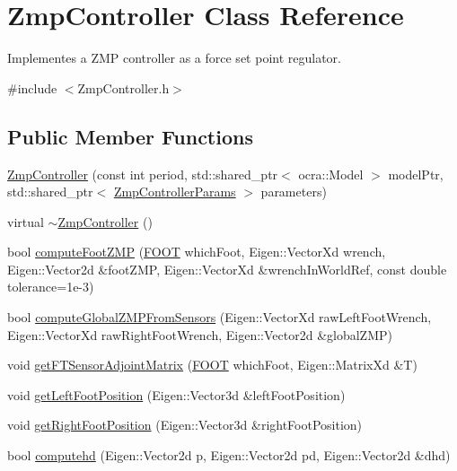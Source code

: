 \hypertarget{classZmpController}{}\section{Zmp\+Controller Class Reference}
\label{classZmpController}


Implementes a Z\+MP controller as a force set point regulator.  




{\ttfamily \#include $<$Zmp\+Controller.\+h$>$}

\subsection*{Public Member Functions}
\begin{DoxyCompactItemize}
\item 
\hyperlink{classZmpController_a4c47608f6d62b6b490808816879c01b7}{Zmp\+Controller} (const int period, std\+::shared\+\_\+ptr$<$ ocra\+::\+Model $>$ model\+Ptr, std\+::shared\+\_\+ptr$<$ \hyperlink{structZmpControllerParams}{Zmp\+Controller\+Params} $>$ parameters)
\item 
virtual \hyperlink{classZmpController_af308a70e70cfe9a1e9569606da8b1739}{$\sim$\+Zmp\+Controller} ()
\item 
bool \hyperlink{classZmpController_a6fd41771d83a31bd190f4031f82649e0}{compute\+Foot\+Z\+MP} (\hyperlink{ZmpController_8h_a4b6a8e135f90bd56e5a57a60efb42529}{F\+O\+OT} which\+Foot, Eigen\+::\+Vector\+Xd wrench, Eigen\+::\+Vector2d \&foot\+Z\+MP, Eigen\+::\+Vector\+Xd \&wrench\+In\+World\+Ref, const double tolerance=1e-\/3)
\item 
bool \hyperlink{classZmpController_aae5cc381a922206dad10ba2d425992ce}{compute\+Global\+Z\+M\+P\+From\+Sensors} (Eigen\+::\+Vector\+Xd raw\+Left\+Foot\+Wrench, Eigen\+::\+Vector\+Xd raw\+Right\+Foot\+Wrench, Eigen\+::\+Vector2d \&global\+Z\+MP)
\item 
void \hyperlink{classZmpController_a58e30464e2976555bdd5fbbc7cca6bba}{get\+F\+T\+Sensor\+Adjoint\+Matrix} (\hyperlink{ZmpController_8h_a4b6a8e135f90bd56e5a57a60efb42529}{F\+O\+OT} which\+Foot, Eigen\+::\+Matrix\+Xd \&T)
\item 
void \hyperlink{classZmpController_ac8e821f72c79fe86102f02c4c155ad30}{get\+Left\+Foot\+Position} (Eigen\+::\+Vector3d \&left\+Foot\+Position)
\item 
void \hyperlink{classZmpController_a815cd495f657cbd93c25610d24982e8c}{get\+Right\+Foot\+Position} (Eigen\+::\+Vector3d \&right\+Foot\+Position)
\item 
bool \hyperlink{classZmpController_a5eab881a51fb2ace1a1d494171353bc7}{computehd} (Eigen\+::\+Vector2d p, Eigen\+::\+Vector2d pd, Eigen\+::\+Vector2d \&dhd)
\end{DoxyCompactItemize}
